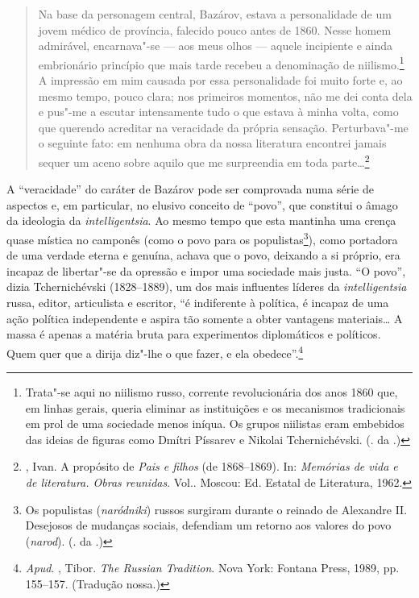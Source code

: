 \begin{quotation}
Na base da personagem central, Bazárov, estava a personalidade de um
jovem médico de província, falecido pouco antes de 1860. Nesse homem
admirável, encarnava"-se --- aos meus olhos --- aquele incipiente e ainda
embrionário princípio que mais tarde recebeu a denominação de niilismo.\footnote{Trata"-se aqui no niilismo russo, corrente revolucionária dos anos 1860 que, em linhas gerais, queria eliminar as instituições e os mecanismos tradicionais em prol de uma sociedade menos iníqua. Os grupos niilistas eram embebidos das ideias de figuras como Dmítri Píssarev e Nikolai Tchernichévski. (. da .)}
A impressão em mim causada por essa personalidade foi muito forte e, ao
mesmo tempo, pouco clara; nos primeiros momentos, não me dei conta dela
e pus"-me a escutar intensamente tudo o que estava à minha volta, como
que querendo acreditar na veracidade da própria sensação. Perturbava"-me
o seguinte fato: em nenhuma obra da nossa literatura encontrei jamais
sequer um aceno sobre aquilo que me surpreendia em toda parte\ldots{}\footnote{, Ivan. A propósito de \emph{Pais e filhos} (de 1868--1869). In: \emph{Memórias de vida e de literatura. Obras reunidas}. Vol.. Moscou: Ed. Estatal de Literatura, 1962.} 
\end{quotation}

A ``veracidade'' do caráter de Bazárov pode ser comprovada numa série de
aspectos e, em particular, no elusivo conceito de ``povo'', que constitui
o âmago da ideologia da \emph{intelligentsia}. Ao mesmo tempo que esta
mantinha uma crença quase mística no camponês (como o povo para os
populistas\footnote{Os populistas (\emph{naródniki}) russos surgiram durante o reinado de Alexandre II. Desejosos de mudanças sociais, defendiam um retorno aos valores do povo (\emph{narod}). (. da .)}), como portadora de uma verdade eterna e genuína, achava que
o povo, deixando a si próprio, era incapaz de libertar"-se da opressão e
impor uma sociedade mais justa. ``O povo'', dizia Tchernichévski (1828--1889), um dos
mais influentes líderes da \emph{intelligentsia} russa, editor,
articulista e escritor, ``é indiferente à política, é incapaz de uma
ação política independente e aspira tão somente a obter vantagens
materiais\ldots{} A massa é apenas a matéria bruta para experimentos diplomáticos e
políticos. Quem quer que a dirija diz"-lhe o que fazer, e ela obedece''.\footnote{\emph{Apud}. , Tibor. \emph{The Russian Tradition}. Nova York: Fontana Press, 1989, pp. 155--157. (Tradução nossa.)}

